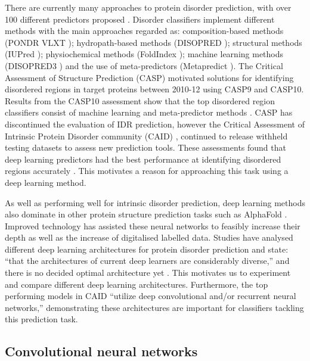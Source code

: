 \documentclass{l4proj}
\begin{document}
There are currently many approaches to protein disorder prediction, with over 100 different predictors proposed \citep{Zhao:22}. Disorder classifiers implement different methods with the main approaches regarded as: composition-based methods (PONDR VLXT \citep{Romero:01}); hydropath-based methods (DISOPRED \citep{Ward:04}); structural methods (IUPred \citep{Dosztanyi:18}); physiochemical methods (FoldIndex \citep{Prilusky:05}); machine learning methods (DISOPRED3 \citep{Jones:15}) and the use of meta-predictors (Metapredict \citep{Emenecker:21}). The Critical Assessment of Structure Prediction (CASP) \citep{casp} motivated solutions for identifying disordered regions in target proteins between 2010-12 using CASP9 and CASP10. Results from the CASP10 assessment \citep{Moult:14} show that the top disordered region classifiers consist of machine learning and meta-predictor methods \citep{Zhao:22}. CASP has discontinued the evaluation of IDR prediction, however the Critical Assessment of Intrinsic Protein Disorder community (CAID) \citep{Necci:21}, continued to release withheld testing datasets to assess new prediction tools. These assessments found that deep learning predictors had the best performance at identifying disordered regions accurately \citep{Zhao:22}. This motivates a reason for approaching this task using a deep learning method.

As well as performing well for intrinsic disorder prediction, deep learning methods also dominate in other protein structure prediction tasks such as AlphaFold \citep{Jumper:21}. Improved technology has assisted these neural networks to feasibly increase their depth as well as the increase of digitalised labelled data. Studies have analysed different deep learning architectures for protein disorder prediction and state: “that the architectures of current deep learners are considerably diverse,” and there is no decided optimal architecture yet \citep{Zhao:22}. This motivates us to experiment and compare different deep learning architectures. Furthermore, the top performing models in CAID “utilize deep convolutional and/or recurrent neural networks,” \citep{Hu:21} demonstrating these architectures are important for classifiers tackling this prediction task.

\subsection{Convolutional neural networks}
\label{chap:background sec:litrevCNN}
\end{document}

